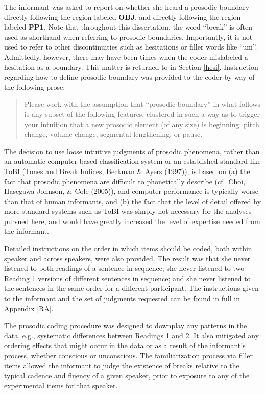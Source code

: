 \documentclass[11pt,oneside]{book}
\begin{document}
The informant was asked to report on whether she heard a prosodic boundary directly following the region labeled \textbf{OBJ}, and directly following the region labeled \textbf{PP1}. Note that throughout this dissertation, the word ``break'' is often used as shorthand when referring to prosodic boundaries. Importantly, it is not used to refer to other discontinuities such as hesitations or filler words like ``um''. Admittedly, however, there may have been times when the coder mislabeled a hesitation as a boundary. This matter is returned to in Section \ref{hesi}. Instruction regarding how to define prosodic boundary was provided to the coder by way of the following prose:

\begin{quote}
Please work with the assumption that ``prosodic boundary'' in what follows is any subset of the following features, clustered in such a way as to trigger your intuition that a new prosodic element (of any size) is beginning: pitch change, volume change, segmental lengthening, or pause.
\end{quote}

The decision to use loose intuitive judgments of prosodic phenomena, rather than an automatic computer-based classification system or an established standard like ToBI (Tones and Break Indices, Beckman \& Ayers (1997)), is based on (a) the fact that prosodic phenomena are difficult to phonetically describe (cf.~Choi, Hasegawa-Johnson, \& Cole (2005)), and computer performance is typically worse than that of human informants, and (b) the fact that the level of detail offered by more standard systems such as ToBI was simply not necessary for the analyses pursued here, and would have greatly increased the level of expertise needed from the informant.

Detailed instructions on the order in which items should be coded, both within speaker and across speakers, were also provided. The result was that she never listened to both readings of a sentence in sequence; she never listened to two Reading 1 versions of different sentences in sequence; and she never listened to the sentences in the same order for a different participant. The instructions given to the informant and the set of judgments requested can be found in full in Appendix \ref{RA}.

The prosodic coding procedure was designed to downplay any patterns in the data, e.g., systematic differences between Readings 1 and 2. It also mitigated any ordering effects that might occur in the data or as a result of the informant's process, whether conscious or unconscious. The familiarization process via filler items allowed the informant to judge the existence of breaks relative to the typical cadence and fluency of a given speaker, prior to exposure to any of the experimental items for that speaker.
\end{document}

